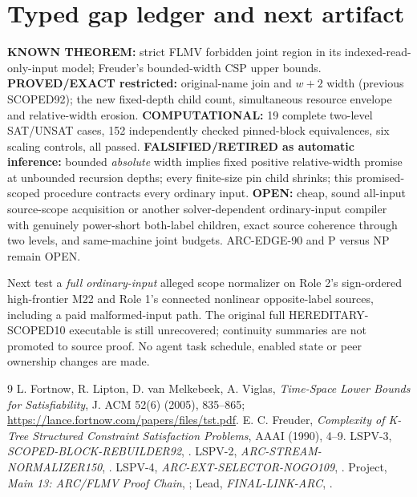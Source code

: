 \documentclass[11pt]{article}
\begin{document}
\section{Typed gap ledger and next artifact}
\textbf{KNOWN THEOREM:} strict FLMV forbidden joint region in its indexed-read-only-input model; Freuder's bounded-width CSP upper bounds.
\textbf{PROVED/EXACT restricted:} original-name join and $w+2$ width (previous SCOPED92); the new fixed-depth child count, simultaneous resource envelope and relative-width erosion.
\textbf{COMPUTATIONAL:} 19 complete two-level SAT/UNSAT cases, 152 independently checked pinned-block equivalences, six scaling controls, all passed.
\textbf{FALSIFIED/RETIRED as automatic inference:} bounded \emph{absolute} width implies fixed positive relative-width promise at unbounded recursion depths; every finite-size pin child shrinks; this promised-scoped procedure contracts every ordinary input.
\textbf{OPEN:} cheap, sound all-input source-scope acquisition or another solver-dependent ordinary-input compiler with genuinely power-short both-label children, exact source coherence through two levels, and same-machine joint budgets. ARC-EDGE-90 and P versus NP remain OPEN.

Next test a \emph{full ordinary-input} alleged scope normalizer on Role 2's sign-ordered high-frontier M22 and Role 1's connected nonlinear opposite-label sources, including a paid malformed-input path. The original full HEREDITARY-SCOPED10 executable is still unrecovered; continuity summaries are not promoted to source proof. No agent task schedule, enabled state or peer ownership changes are made.

\begin{thebibliography}{9}
 L. Fortnow, R. Lipton, D. van Melkebeek, A. Viglas, \emph{Time-Space Lower Bounds for Satisfiability}, J. ACM 52(6) (2005), 835--865; \url{https://lance.fortnow.com/papers/files/tst.pdf}.
 E. C. Freuder, \emph{Complexity of K-Tree Structured Constraint Satisfaction Problems}, AAAI (1990), 4--9.
 LSPV-3, \emph{SCOPED-BLOCK-REBUILDER92}, .
 LSPV-2, \emph{ARC-STREAM-NORMALIZER150}, .
 LSPV-4, \emph{ARC-EXT-SELECTOR-NOGO109}, .
 Project, \emph{Main 13: ARC/FLMV Proof Chain}, ; Lead, \emph{FINAL-LINK-ARC}, .
\end{thebibliography}
\end{document}

